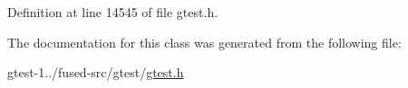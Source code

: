 \-Definition at line 14545 of file gtest.\-h.



\-The documentation for this class was generated from the following file\-:\begin{DoxyCompactItemize}
\item 
gtest-\/1../fused-\/src/gtest/\hyperlink{fused-src_2gtest_2gtest_8h}{gtest.\-h}\end{DoxyCompactItemize}

